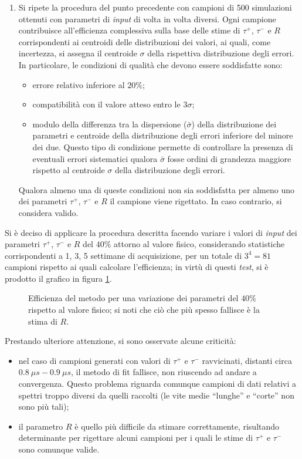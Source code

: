 \documentclass[10pt, oneside, a4paper]{article}   	%
\begin{document}
\begin{enumerate}
 \item Si ripete la procedura del punto precedente con campioni di 500 simulazioni ottenuti con parametri di \textit{input} di volta in volta diversi. Ogni campione contribuisce all'efficienza complessiva sulla base delle stime di $\tau^+$, $\tau^-$ e $R$ corrispondenti ai centroidi delle distribuzioni dei valori, ai quali, come incertezza, si assegna il centroide $\sigma$ della rispettiva distribuzione degli errori. In particolare, le condizioni di qualità che devono essere soddisfatte sono:  
 \begin{itemize}
  \item errore relativo inferiore al $20\%$;
  \item compatibilità con il valore atteso entro le $3\sigma$;
  \item modulo della differenza tra la dispersione ($\bar{\sigma}$) della distribuzione dei parametri e centroide della distribuzione degli errori inferiore del minore dei due. Questo tipo di condizione permette di controllare la presenza di eventuali errori sistematici qualora $\bar{\sigma}$ fosse ordini di grandezza maggiore rispetto al centroide $\sigma$ della distribuzione degli errori.  
 \end{itemize}
Qualora almeno una di queste condizioni non sia soddisfatta per almeno uno dei parametri $\tau^+$, $\tau^-$ e $R$ il campione viene rigettato. In caso contrario, si considera valido. 
\end{enumerate}
Si è deciso di applicare la procedura descritta facendo variare i valori di \textit{input} dei parametri $\tau^+$, $\tau^-$ e $R$ del $40\%$ attorno al valore fisico, considerando statistiche corrispondenti a 1, 3, 5 settimane di acquisizione, per un totale di $3^4=81$ campioni rispetto ai quali calcolare l'efficienza; in virtù di questi \textit{test}, si è prodotto il grafico in figura \ref{fig:eff1}.
%
\begin{figure}[b!]
  \centering
  
  \caption{Efficienza del metodo per una variazione dei parametri del $40\%$ rispetto al valore fisico; si noti che ciò che più spesso fallisce è la stima di $R$.}
  \label{fig:eff1}
\end{figure}
%
Prestando ulteriore attenzione, si sono osservate alcune criticità:
\begin{itemize}
 \item nel caso di campioni generati con valori di $\tau^+$ e $\tau^-$ ravvicinati, distanti circa $0.8 \ \mu s - 0.9 \ \mu s$, il metodo di fit fallisce, non riuscendo ad andare a convergenza. Questo problema riguarda comunque campioni di dati relativi a spettri troppo diversi da quelli raccolti (le vite medie ``lunghe'' e ``corte'' non sono più tali);
 \item il parametro $R$ è quello più difficile da stimare correttamente, risultando determinante per rigettare alcuni campioni per i quali le stime di $\tau^+$ e $\tau^-$ sono comunque valide.  
\end{itemize}
\end{document}
